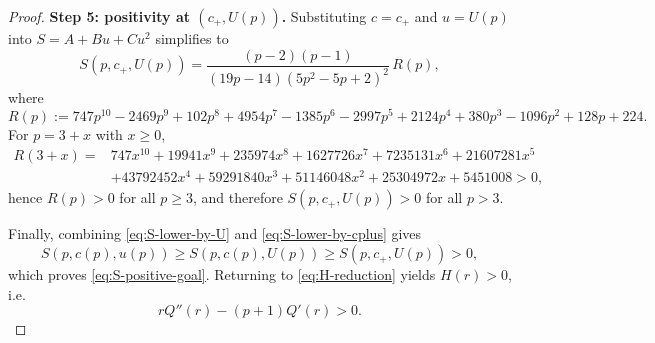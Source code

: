 \documentclass[11pt]{article}
\theoremstyle{definition}
\newcommand{\1}{\mathbf{1}}
\begin{document}
\begin{proof}
\medskip
\noindent\textbf{Step 5: positivity at $(c_+,U(p))$.}
Substituting $c=c_+$ and $u=U(p)$ into $S=A+Bu+Cu^2$ simplifies to
\[
S(p,c_+,U(p))
=
\frac{(p-2)(p-1)}{(19p-14)(5p^2-5p+2)^2}\,R(p),
\]
where
\[
R(p):=747p^{10}-2469p^9+102p^8+4954p^7-1385p^6-2997p^5+2124p^4+380p^3-1096p^2+128p+224.
\]
For $p=3+x$ with $x\ge0$,
\begin{align*}
R(3+x)=&
747x^{10}+19941x^9+235974x^8+1627726x^7+7235131x^6+21607281x^5\\&
+43792452x^4+59291840x^3+51146048x^2+25304972x+5451008>0,
\end{align*}
hence $R(p)>0$ for all $p\ge3$, and therefore $S(p,c_+,U(p))>0$ for all $p>3$.

Finally, combining \eqref{eq:S-lower-by-U} and \eqref{eq:S-lower-by-cplus} gives
\[
S(p,c(p),u(p))\ge S(p,c(p),U(p))\ge S(p,c_+,U(p))>0,
\]
which proves \eqref{eq:S-positive-goal}. Returning to \eqref{eq:H-reduction} yields
$H(r)>0$, i.e.
\[
rQ''(r)-(p+1)Q'(r)>0.
\]
\end{proof}



\end{document}
